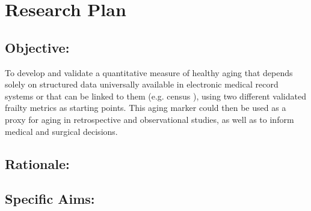 \section{Research Plan }\label{research-plan}


\subsection{Objective:}\label{objective}
  
To develop and validate a quantitative measure of healthy aging that depends solely on structured data universally available in electronic medical record systems or that can be linked to them (e.g. census ),
using two different validated frailty metrics as starting points. This
aging marker could then be used as a proxy for aging in retrospective
and observational studies, as well as to inform medical and surgical
decisions.


\subsection{Rationale:}\label{rationale}

\subsection{Specific Aims:}\label{specific-aims}
